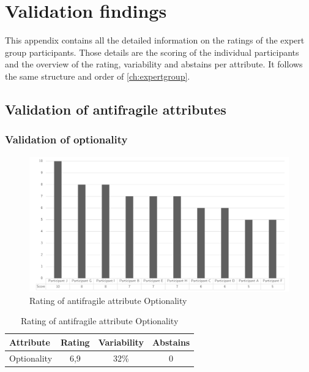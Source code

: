 \chapter{Validation findings}
This appendix contains all the detailed information on the ratings of the expert group participants. Those details are the scoring of the individual participants and the overview of the rating, variability and abstains per \gls{attribute}. It follows the same structure and order of \cref{ch:expertgroup}.
\section{Validation of antifragile attributes}
\label{sec:validationofafattributes}
\subsection{Validation of optionality}
\label{sub:validationofoptionality}
\begin{figure}[H]
	\centering
	\includegraphics[width=0.9\linewidth]{images/scoreafoptionality}
	\caption[Rating of antifragile attribute Optionality]{Rating of antifragile attribute Optionality}
	\label{fig:appscoringafoptionality}
\end{figure}
\begin{table}[H]
	\centering
	\begin{tabular}{p{}ccc}
		\toprule
		\textbf{Attribute} & \textbf{Rating} & \textbf{Variability} & \textbf{Abstains} \\
		\midrule
		Optionality & 6,9 & 32\% & 0 \\%
		\bottomrule
	\end{tabular}%
	\caption[Rating of antifragile attribute Optionality]{Rating of antifragile attribute Optionality}
	\label{tab:appscoringafoptionality}%
\end{table}%
\newpage
